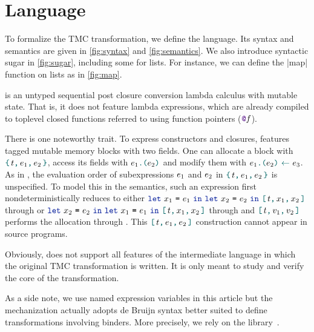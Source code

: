\section{Language}

To formalize the TMC transformation, we define the \DataLang language.
Its syntax and semantics are given in \cref{fig:syntax} and \cref{fig:semantics}.
We also introduce syntactic sugar in \cref{fig:sugar}, including some for lists.
For instance, we can define the \datalang|map| function on lists as in \cref{fig:map}.

\DataLang is an untyped sequential post closure conversion lambda calculus with mutable state.
That is, it does not feature lambda expressions, which are already compiled to toplevel closed functions referred to using function pointers ($\datalangFnptr{\datalangFn}$).

There is one noteworthy trait.
To express constructors and closures, \DataLang features tagged mutable memory blocks with two fields.
One can allocate a block with $\datalangBlock{\datalangTag}{\datalangExpr_1}{\datalangExpr_2}$, access its fields with $\datalangLoad{\datalangExpr_1}{\datalangExpr_2}$ and modify them with $\datalangStore{\datalangExpr_1}{\datalangExpr_2}{\datalangExpr_3}$.
As in \OCaml, the evaluation order of subexpressions $\datalangExpr_1$ and $\datalangExpr_2$ in $\datalangBlock{\datalangTag}{\datalangExpr_1}{\datalangExpr_2}$ is unspecified.
To model this in the semantics, such an expression first nondeterministically reduces to either $\datalangLet{\datalangVar_1}{\datalangExpr_1}{\datalangLet{\datalangVar_2}{\datalangExpr_2}{\datalangBlockDet{\datalangTag}{\datalangVar_1}{\datalangVar_2}}}$ through  or $\datalangLet{\datalangVar_2}{\datalangExpr_2}{\datalangLet{\datalangVar_1}{\datalangExpr_1}{\datalangBlockDet{\datalangTag}{\datalangVar_1}{\datalangVar_2}}}$ through  and $\datalangBlockDet{\datalangTag}{\datalangVal_1}{\datalangVal_2}$ performs the allocation  through .
This $\datalangBlockDet{\datalangTag}{\datalangExpr_1}{\datalangExpr_2}$ construction cannot appear in source programs.


Obviously, \DataLang does not support all features of the \LambdaLang intermediate language in which the original TMC transformation is written.
It is only meant to study and verify the core of the transformation.

As a side note, we use named expression variables in this article but the \Coq mechanization actually adopts de Bruijn syntax better suited to define transformations involving binders.
More precisely, we rely on the \Autosubst library~\cite{DBLP:conf/itp/SchaferTS15}.




